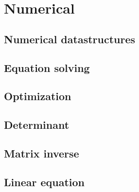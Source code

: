 
\chapter{Numerical}

	\section{Numerical datastructures}

	\section{Equation solving}

	\section{Optimization}

	\section{Determinant}

	\section{Matrix inverse}

	\section{Linear equation}

